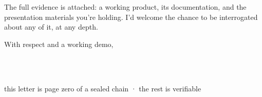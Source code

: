 \documentclass[11pt]{article}
\begin{document}
The full evidence is attached: a working product, its documentation, and the
presentation materials you're holding. I'd welcome the chance to be interrogated
about any of it, at any depth.

\vspace{4mm}
With respect and a working demo,

\vspace{8mm}
{\DisplayFont\SizeLead{\MyName}}\\
{\AccentFont{}}

\vfill
\begin{center}
\\[1mm]
{\color{FogGray}\ttfamily\fontsize{6.5pt}{8pt}\selectfont this letter is page zero of a sealed chain · the rest is verifiable}
\end{center}
\end{document}
